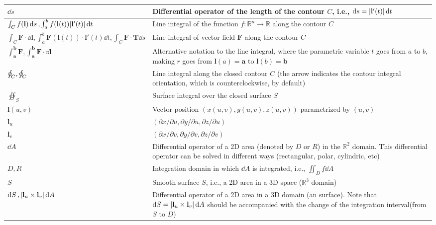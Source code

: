 \documentclass{article}
\begin{document}
\begin{xltabular}{\textwidth}{XX}
    \(\dd{s}\) & Differential operator of the length of the contour \(C\), i.e., \(\dd{s} = \abs{\mathbf{l}'(t)} \dd{t}\) \cite{stewartCalculus2011} \\ \hline
    \(\int_C f(\mathbf{l}) \dd{s}, \int_a^b f(\mathbf{l}(t)) \abs{\mathbf{l}'(t)} \dd{t}\) & Line integral of the function \(f: \mathbb{R}^{n} \rightarrow \mathbb{R}\) along the contour \(C\) \cite{apostolCalculus2ndEdn1967,stewartCalculus2011} \\ \hline
    \(\int_C \mathbf{F}\cdot\dd{\mathbf{l}}, \int_a^b \mathbf{F}(\mathbf{l}(t)) \cdot \mathbf{l}'(t) \dd{t}, \int_C \mathbf{F}\cdot\mathbf{T} \dd{s}\) & Line integral of vector field \(\mathbf{F}\) along the contour \(C\)  \cite{apostolCalculus2ndEdn1967,stewartCalculus2011} \\ \hline
    \(\int_\mathbf{a}^\mathbf{b} \mathbf{F}, \int_\mathbf{a}^\mathbf{b} \mathbf{F}\cdot\dd{\mathbf{l}}\) & Alternative notation to the line integral, where the parametric variable \(t\) goes from \(a\) to \(b\), making \(r\) goes from \(\mathbf{l}(a) = \mathbf{a}\) to \(\mathbf{l}(b) = \mathbf{b}\) \cite{apostolCalculus2ndEdn1967} \\ \hline
    \(\oint_C, \varointctrclockwise_C\) & Line integral along the closed contour \(C\) (the arrow indicates the contour integral orientation, which is counterclockwise, by default) \\ \hline
    \(\oiint_S\) & Surface integral over the closed surface \(S\) \\ \hline
    \(\mathbf{l}(u,v)\) & Vector position \((x(u,v), y(u,v), z(u,v))\) parametrized by \((u,v)\)\\ \hline
    \(\mathbf{l}_u\) & \((\partial x/ \partial u, \partial y/ \partial u, \partial z/ \partial u)\)\\ \hline
    \(\mathbf{l}_v\) & \((\partial x/ \partial v, \partial y/ \partial v, \partial z/ \partial v)\)\\ \hline
    \(\dd{A}\) & Differential operator of a 2D area (denoted by \(D\) or \(R\)) in the \(\mathbb{R}^2\) domain. This differential operator can be solved in different ways (rectangular, polar, cylindric, etc) \cite{stewartCalculus2011} \\ \hline
    \(D, R\) & Integration domain in which \(\dd{A}\) is integrated, i.e., \(\iint_D f \dd{A}\) \cite{stewartCalculus2011} \\ \hline
    \(S\)& Smooth surface \(S\), i.e., a 2D area in a 3D space (\(\mathbb{R}^3\) domain) \\ \hline
    \(\dd{S}, \abs{\mathbf{l}_u\times\mathbf{l}_v} \dd{A} \)& Differential operator of a 2D area in a 3D domain (an surface). Note that \(\dd{S} = \abs{\mathbf{l}_u\times\mathbf{l}_v} \dd{A}\) should be accompanied with the change of the integration interval(from \(S\) to \(D\)) \\ \hline

\end{xltabular}
\end{document}
